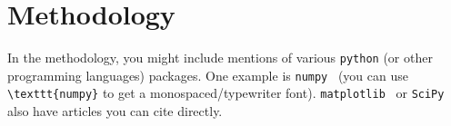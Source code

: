 \documentclass[a4paper,masters,en,listoffigures,listoftables]{NMBU}
\begin{document}
\clearpage
\section{Methodology}

In the methodology, you might include mentions of various \texttt{python} (or other programming languages) packages. One example is \texttt{numpy}~\cite{NumPy}  (you can use \verb|\texttt{numpy}| to get a monospaced/typewriter font). \texttt{matplotlib}~\cite{Matplotlib} or \texttt{SciPy}~\cite{SciPy} also have articles you can cite directly.


\clearpage
{} %

\clearpage
\appendices %
\end{document}

